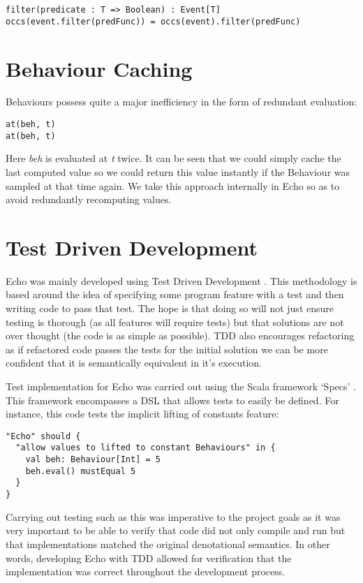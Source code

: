 \begin{verbatim}
filter(predicate : T => Boolean) : Event[T]
occs(event.filter(predFunc)) = occs(event).filter(predFunc)
\end{verbatim}  

  \section{Behaviour Caching}
    Behaviours possess quite a major inefficiency in the form of redundant evaluation:

\begin{verbatim}
at(beh, t)
at(beh, t)
\end{verbatim}  

    Here \emph{beh} is evaluated at \emph{t} twice. It can be seen that we could simply cache the last
    computed value so we could return this value instantly if the Behaviour was sampled at that time again.
    We take this approach internally in Echo so as to avoid redundantly recomputing values. 
  
  \section{Test Driven Development}
    Echo was mainly developed using Test Driven Development \cite{Cunningham}. This methodology is based around the idea
    of specifying some program feature with a test and then writing code to pass that test. The hope
    is that doing so will not just ensure testing is thorough (as all features will require tests) but
    that solutions are not over thought (the code is as simple as possible). TDD also encourages
    refactoring as if refactored code passes the tests for the initial solution we can be more confident
    that it is semantically equivalent in it's execution.

    Test implementation for Echo was carried out using the Scala framework `Specs' \cite{EricTorreborre}. This framework
    encompasses a DSL that allows tests to easily be defined. For instance, this code tests the implicit lifting
    of constants feature:

\begin{verbatim}
"Echo" should {
  "allow values to lifted to constant Behaviours" in {
    val beh: Behaviour[Int] = 5
    beh.eval() mustEqual 5
  }
}
\end{verbatim}

    Carrying out testing such as this was imperative to the project goals as it was very important to be able
    to verify that code did not only compile and run but that implementations matched the original denotational 
    semantics. In other words, developing Echo with TDD allowed for verification that the implementation
    was correct throughout the development process.